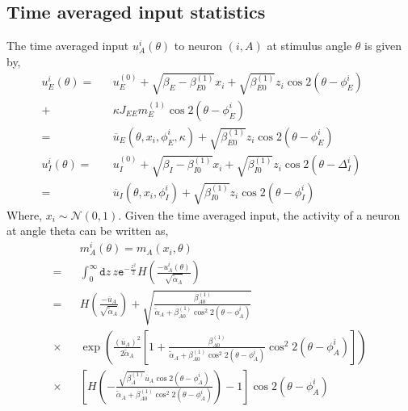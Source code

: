 \documentclass[%
 reprint,
 amsmath,amssymb,
 aps,
]{revtex4-1}
\begin{document}
\subsection{Time averaged input statistics}
The time averaged input $u_A^{i} (\theta)$ to neuron $(i, A)$ at stimulus angle $\theta$ is given by, 
\begin{eqnarray}
u_E^{i} (\theta) =&& u^{(0)}_E + \sqrt{\beta_E - \beta_{E0}^{(1)}} x_i +  \sqrt{\beta_{E0}^{(1)}} z_i \cos 2 (\theta - \phi_E^i) \,\,\,\, \,\,\,\,\nonumber \\
+&& \kappa J_{EE} m_E^{(1)} \cos 2 ( \theta  - \phi_E^i) \\
=&& \overline{u}_E(\theta, x_i, \phi_E^i, \kappa) +  \sqrt{\beta_{E0}^{(1)}} z_i \cos 2 (\theta - \phi_E^i) \\
u_I^{i} (\theta) =&& u^{(0)}_I + \sqrt{\beta_I - \beta_{I0}^{(1)}} x_i +  \sqrt{\beta_{I0}^{(1)}} z_i \cos 2 (\theta - \Delta_I^i) \\
=&& \overline{u}_I(\theta, x_i, \phi_I^i) +  \sqrt{\beta_{I0}^{(1)}} z_i \cos 2 (\theta - \phi_I^i)
\end{eqnarray}
Where, $x_i \sim \mathcal{N}(0, 1)$. 
Given the time averaged input, the activity of a neuron at angle theta can be written as, 
\begin{eqnarray}
&&m_A^i(\theta) = m_A(x_i, \theta) \nonumber \\
=&& \int_{0}^{\infty} \mathtt{d} z\,  z \mathtt{e}^{-\frac{z^2}{2}} H\left( \frac{-u_A^i(\theta)}{\sqrt{\tilde{\alpha}_A }} \right)  \\
=&& H\left( \frac{-\overline{u}_A }{\sqrt{\tilde{\alpha}_A }}  \right) + \sqrt{\frac{\beta_{A0}^{(1)} }{  \tilde{\alpha}_A + \beta_{A0}^{(1)} \cos^2 2 (\theta - \phi_A^i) }} \nonumber \\ 
\times&&  \exp \left( \frac{\left( \overline{u}_A \right)^2  }{ 2 \tilde{\alpha}_A} \left[ 1 + \frac{\beta_{A0}^{(1)} }{ \tilde{\alpha}_A + \beta_{A0}^{(1)} \cos^2 2 (\theta - \phi_A^i)  } \cos^2 2 (\theta - \phi_A^i) \right] \right) \nonumber \\
\times&& \left[ H \left( - \frac{ \sqrt{\beta_A^{(1)} } \overline{u}_A \cos 2 (\theta - \phi_A^i)} {  \tilde{\alpha}_A + \beta_{A0}^{(1)} \cos^2 2 (\theta - \phi_A^i) } \right) - 1 \right] \cos2(\theta - \phi_A^i) \label{mAiofTheta} 
\end{eqnarray}
\end{document}
